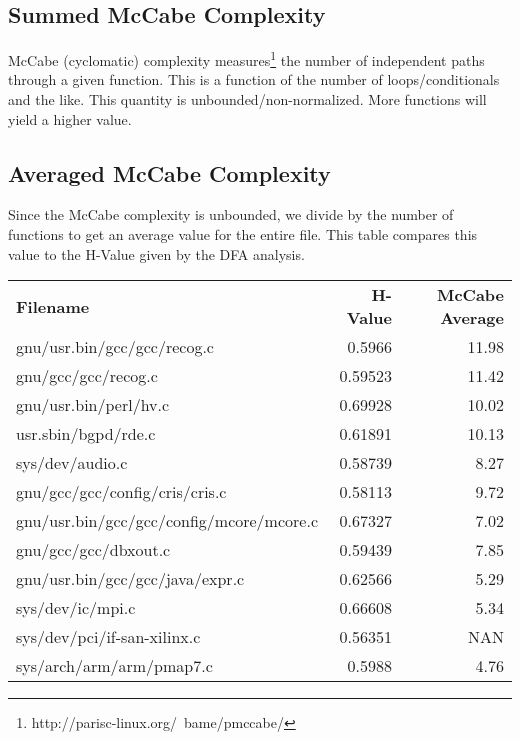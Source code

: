 
\subsection{Summed McCabe Complexity}
McCabe (cyclomatic) complexity \cite{McCabe:SoftwareComplexity:76} measures\footnote{http://parisc-linux.org/~bame/pmccabe/} the number of independent paths through a given function.  This is a function of the number of loops/conditionals and the like.  This quantity is unbounded/non-normalized.  More functions will yield a higher value.




\subsection{Averaged McCabe Complexity}
\label{McCabeAveraged}

Since the McCabe complexity is unbounded, we divide by the number of functions to get an average value for the entire file.  This table compares this value to the H-Value given by the DFA analysis.


\begin{tabular}{l r r}
\textbf{Filename} & \textbf{H-Value} & \textbf{McCabe Average} \\
gnu/usr.bin/gcc/gcc/recog.c &    0.5966 &  11.98 \\
gnu/gcc/gcc/recog.c          &   0.59523 & 11.42  \\
gnu/usr.bin/perl/hv.c        &   0.69928 & 10.02 \\
usr.sbin/bgpd/rde.c          &   0.61891 & 10.13 \\
sys/dev/audio.c               &  0.58739  & 8.27 \\
gnu/gcc/gcc/config/cris/cris.c & 0.58113 & 9.72 \\
gnu/usr.bin/gcc/gcc/config/mcore/mcore.c & 0.67327 & 7.02 \\
gnu/gcc/gcc/dbxout.c         &   0.59439 & 7.85   \\
gnu/usr.bin/gcc/gcc/java/expr.c & 0.62566 & 5.29 \\
sys/dev/ic/mpi.c             &   0.66608 & 5.34      \\
sys/dev/pci/if-san-xilinx.c   &  0.56351 &  NAN \\
sys/arch/arm/arm/pmap7.c    &    0.5988 &  4.76 \\
\end{tabular}

